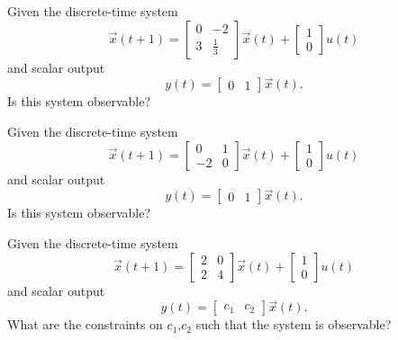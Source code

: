 

\begin{enumerate}




\qitem 
Given the discrete-time system $$\vec{x}(t+1) = \begin{bmatrix}
    0 & -2          \\
    3 & \frac{1}{3}
  \end{bmatrix}
  \vec{x}(t) +
  \begin{bmatrix}
    1 \\0
  \end{bmatrix} u(t)$$
and scalar output $$y(t) = \begin{bmatrix}
    0 & 1
  \end{bmatrix} \vec{x}(t).$$ Is this system observable?




\qitem 
Given the discrete-time system $$\vec{x}(t+1) = \begin{bmatrix}
    0 & 1          \\
    -2 & 0
  \end{bmatrix}
  \vec{x}(t) +
  \begin{bmatrix}
    1 \\0
  \end{bmatrix} u(t)$$
and scalar output $$y(t) = \begin{bmatrix}
    0 & 1
  \end{bmatrix} \vec{x}(t).$$ Is this system observable?




\qitem 
Given the discrete-time system $$\vec{x}(t+1) = \begin{bmatrix}
    2 & 0          \\
    2 & 4
  \end{bmatrix}
  \vec{x}(t) +
  \begin{bmatrix}
    1 \\0
  \end{bmatrix} u(t)$$
and scalar output $$y(t) = \begin{bmatrix}
    c_1 & c_2
  \end{bmatrix} \vec{x}(t).$$ What are the constraints on $c_1$,$c_2$ such that  the system is observable?


\end{enumerate}
